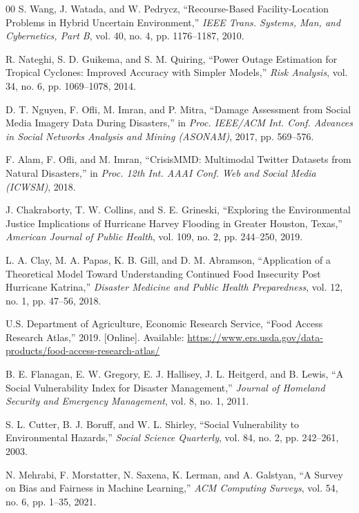 \documentclass[conference]{IEEEtran}
\renewcommand{\_}{\origunderscore\allowbreak}
\begin{document}
\begin{thebibliography}{00}
S. Wang, J. Watada, and W. Pedrycz,
``Recourse-Based Facility-Location Problems in Hybrid Uncertain
Environment,'' \textit{IEEE Trans. Systems, Man, and Cybernetics,
Part B}, vol. 40, no. 4, pp. 1176--1187, 2010.

R. Nateghi, S. D. Guikema, and S. M. Quiring,
``Power Outage Estimation for Tropical Cyclones: Improved
Accuracy with Simpler Models,''
\textit{Risk Analysis}, vol. 34, no. 6, pp. 1069--1078, 2014.

D. T. Nguyen, F. Ofli, M. Imran, and P. Mitra,
``Damage Assessment from Social Media Imagery Data During
Disasters,'' in \textit{Proc. IEEE/ACM Int. Conf. Advances in
Social Networks Analysis and Mining (ASONAM)}, 2017,
pp. 569--576.

F. Alam, F. Ofli, and M. Imran,
``CrisisMMD: Multimodal Twitter Datasets from Natural
Disasters,'' in \textit{Proc. 12th Int. AAAI Conf. Web and
Social Media (ICWSM)}, 2018.

J. Chakraborty, T. W. Collins, and S. E. Grineski,
``Exploring the Environmental Justice Implications of Hurricane
Harvey Flooding in Greater Houston, Texas,''
\textit{American Journal of Public Health},
vol. 109, no. 2, pp. 244--250, 2019.

L. A. Clay, M. A. Papas, K. B. Gill, and D. M. Abramson,
``Application of a Theoretical Model Toward Understanding Continued
Food Insecurity Post Hurricane Katrina,''
\textit{Disaster Medicine and Public Health Preparedness},
vol. 12, no. 1, pp. 47--56, 2018.

U.S. Department of Agriculture, Economic Research Service,
``Food Access Research Atlas,'' 2019.
[Online]. Available:
\url{https://www.ers.usda.gov/data-products/food-access-research-atlas/}

B. E. Flanagan, E. W. Gregory, E. J. Hallisey, J. L. Heitgerd,
and B. Lewis,
``A Social Vulnerability Index for Disaster Management,''
\textit{Journal of Homeland Security and Emergency Management},
vol. 8, no. 1, 2011.

S. L. Cutter, B. J. Boruff, and W. L. Shirley,
``Social Vulnerability to Environmental Hazards,''
\textit{Social Science Quarterly},
vol. 84, no. 2, pp. 242--261, 2003.

N. Mehrabi, F. Morstatter, N. Saxena, K. Lerman, and A. Galstyan,
``A Survey on Bias and Fairness in Machine Learning,''
\textit{ACM Computing Surveys},
vol. 54, no. 6, pp. 1--35, 2021.


\end{thebibliography}
\end{document}
